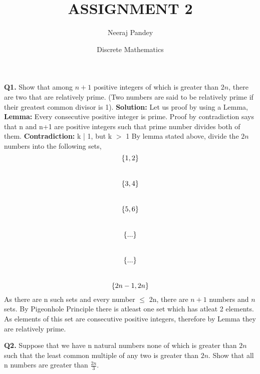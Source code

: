 \documentclass{article}
\title{ASSIGNMENT 2}
\author{Neeraj Pandey }
\date{Discrete Mathematics}
\begin{document}
\maketitle
\textbf{Q1.} Show that among $n + 1$ positive integers of which is greater than $2n$, there are two that are relatively prime. (Two numbers are said to be relatively prime if their greatest common divisor is 1).
\newline
\textbf{Solution: } Let us proof by using a Lemma,
\newline
\textbf{Lemma: } Every consecutive positive integer is prime. Proof by contradiction says that n and n+1 are positive integers such that prime number divides both of them.
\newline
\textbf{Contradiction:} k | 1, but k $>$ 1
By lemma stated above, divide the $2n$ numbers into the following sets,
\newline
\[ \small\{ 1, 2\small\}\]\\
\[ \small\{ 3, 4\small\}\]\\
\[ \small\{ 5, 6\small\}\]\\
\[ \small\{ ...\small\}\]\\
\[ \small\{ ... \small\}\]\\
\[ \small\{ 2n - 1, 2n\small\}\]
\newline
As there are n such sets and every number $\leq$ 2n, there are $n+1$ numbers and $n$ sets. By Pigeonhole Principle there is atleast one set which has atleat 2 elements. As elements of this set are consecutive positive integers, therefore by Lemma they are relatively prime.
\newpage
\begin{flushleft}
\textbf{Q2.}  Suppose that we have n natural numbers none of which is greater than $2n$ such that the least common multiple of any two is greater than $2n$. Show that all n numbers are greater than \(\frac{2n}{3}\).
\end{flushleft}
\end{document}
